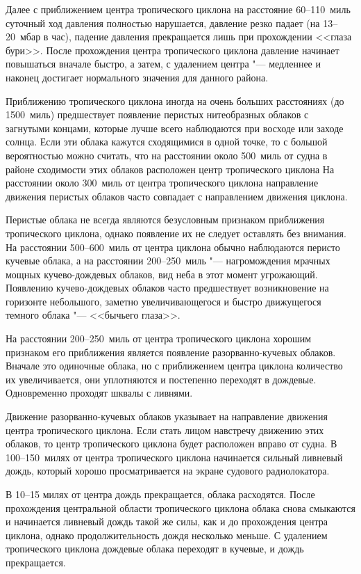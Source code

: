 Далее с приближением центра тропического циклона на расстояние
60--110~миль суточный ход давления полностью нарушается, давление
резко падает (на 13--20~мбар в час), падение давления прекращается лишь
при прохождении <<глаза бури>>. После прохождения центра тропического
циклона давление начинает повышаться вначале быстро, а затем, с
удалением центра "--- медленнее и наконец достигает нормального значения
для данного района.

 Приближению тропического циклона иногда на очень больших
расстояниях (до 1500~миль) предшествует появление перистых
нитеобразных облаков с загнутыми концами, которые лучше всего
наблюдаются при восходе или заходе солнца. Если эти облака кажутся
сходящимися в одной точке, то с большой вероятностью можно считать,
что на расстоянии около 500~миль от судна в районе сходимости этих
облаков расположен центр тропического циклона На расстоянии около 300~миль
от центра тропического циклона направление движения перистых
облаков часто совпадает с направлением движения циклона.

Перистые облака не всегда являются безусловным признаком приближения
тропического циклона, однако появление их не следует оставлять без
внимания. На расстоянии 500--600~миль от центра циклона обычно
наблюдаются перисто кучевые облака, а на расстоянии 200--250~миль "---
нагромождения мрачных мощных кучево-дождевых облаков, вид неба в этот
момент угрожающий. Появлению кучево-дождевых облаков часто
предшествует возникновение на горизонте небольшого, заметно
увеличивающегося и быстро движущегося темного облака "--- <<бычьего
глаза>>.

На расстоянии 200--250~миль от центра тропического циклона хорошим
признаком его приближения является появление разорванно-кучевых
облаков. Вначале это одиночные облака, но с приближением центра
циклона количество их увеличивается, они уплотняются и постепенно
переходят в дождевые. Одновременно проходят шквалы с ливнями.

Движение разорванно-кучевых облаков указывает на направление движения
центра тропического циклона. Если стать лицом навстречу движению этих
облаков, то центр тропического циклона будет расположен вправо от
судна. В 100--150~милях от центра тропического циклона начинается
сильный ливневый дождь, который хорошо просматривается на экране
судового радиолокатора.

В 10--15 милях от центра дождь прекращается, облака расходятся. После
прохождения центральной области тропического циклона облака снова
смыкаются и начинается ливневый дождь такой же силы, как и до
прохождения центра циклона, однако продолжительность дождя несколько
меньше. С удалением тропического циклона дождевые облака переходят в
кучевые, и дождь прекращается.

